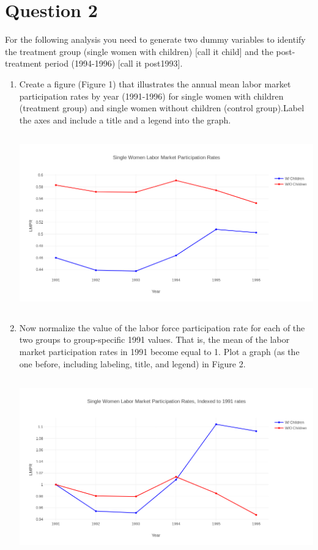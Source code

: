 \documentclass{article}
\begin{document}
\section{Question 2}

For the following analysis you need to generate two dummy variables to identify the treatment group (single women with children) [call it child] and the post-treatment period (1994-1996) [call it post1993].

\begin{enumerate}[label=\alph*]
\item  Create a figure (Figure 1) that illustrates the annual mean labor market participation rates by year (1991-1996) for single women with children (treatment group) and single women without children (control group).Label the axes and include a title and a legend into the graph.


\includegraphics[width=5in, height=3in]{newplot}



\item Now normalize the value of the labor force participation rate for each of the two groups to group-specific 1991 values. That is, the mean of the labor  market participation rates in 1991 become equal to 1. Plot a graph (as the one before, including labeling, title, and legend) in Figure 2.



\includegraphics[width=5in, height=3in]{figure2}





\end{enumerate}
\end{document}
